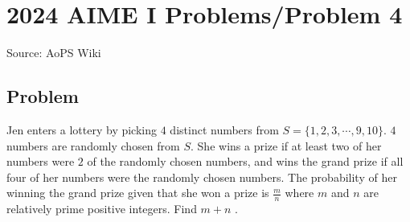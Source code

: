 \documentclass[12pt]{article}
\begin{document}
\section*{{2024 AIME I Problems/Problem 4}}
Source: AoPS Wiki

\subsection*{Problem}
Jen enters a lottery by picking $4$ distinct numbers from $S=\{1,2,3,\cdots,9,10\}.$ $4$ numbers are randomly chosen from $S.$ She wins a prize if at least two of her numbers were $2$ of the randomly chosen numbers, and wins the grand prize if all four of her numbers were the randomly chosen numbers. The probability of her winning the grand prize given that she won a prize is $\tfrac{m}{n}$ where $m$ and $n$ are relatively prime positive integers. Find $m+n$ .
\end{document}
